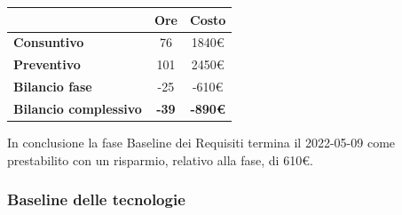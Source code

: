 \begin{center}
	\renewcommand{\arraystretch}{1.8}
	\begin{tabular}{ | l |c|c| }
    \hline
    & \textbf{Ore} & \textbf{Costo} \\
	\hline
    \textbf{Consuntivo} & 76 & 1840\euro \\
    \hline
    \textbf{Preventivo} & 101 & 2450\euro \\
    \hline
    \textbf{Bilancio fase} & -25 & -610\euro \\
    \hline
    \textbf{Bilancio complessivo} & \textbf{-39} & \textbf{-890\euro} \\
    \hline
    \end{tabular}
\end{center}
In conclusione la fase Baseline dei Requisiti termina il 2022-05-09 come prestabilito con un risparmio, relativo
alla fase, di 610€.

\subsubsection{Baseline delle tecnologie}
